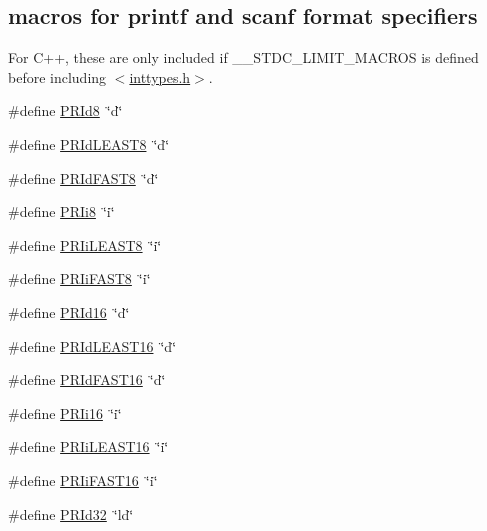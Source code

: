 \subsection*{macros for printf and scanf format specifiers}
\label{_amgrp308366f5f1be938cc93967ed6dbe20e9}%
For C++, these are only included if \+\_\+\+\_\+\+S\+T\+D\+C\+\_\+\+L\+I\+M\+I\+T\+\_\+\+M\+A\+C\+R\+OS is defined before including $<$\hyperlink{inttypes_8h}{inttypes.\+h}$>$. \begin{DoxyCompactItemize}
\item 
\#define \hyperlink{group__avr__inttypes_gae53c45f590033ad1f2f517faf3ab2f1b}{P\+R\+Id8}~\char`\"{}d\char`\"{}
\item 
\#define \hyperlink{group__avr__inttypes_ga404fd01f0b890cb8fac8641aaa704b57}{P\+R\+Id\+L\+E\+A\+S\+T8}~\char`\"{}d\char`\"{}
\item 
\#define \hyperlink{group__avr__inttypes_ga943961b7e7e564388dd743593db5bbbb}{P\+R\+Id\+F\+A\+S\+T8}~\char`\"{}d\char`\"{}
\item 
\#define \hyperlink{group__avr__inttypes_gadbe02b78cca747b2fe1a8f7fc5f5cd47}{P\+R\+Ii8}~\char`\"{}i\char`\"{}
\item 
\#define \hyperlink{group__avr__inttypes_ga526151b1725956030b501d9dd506f2e1}{P\+R\+Ii\+L\+E\+A\+S\+T8}~\char`\"{}i\char`\"{}
\item 
\#define \hyperlink{group__avr__inttypes_ga64fb4e44c3ff09179fc445979b7fdad1}{P\+R\+Ii\+F\+A\+S\+T8}~\char`\"{}i\char`\"{}
\item 
\#define \hyperlink{group__avr__inttypes_ga087e50fe0283aacc71d7138d13e91939}{P\+R\+Id16}~\char`\"{}d\char`\"{}
\item 
\#define \hyperlink{group__avr__inttypes_gae90ab00cb4417081dc68e9fd6c0e129a}{P\+R\+Id\+L\+E\+A\+S\+T16}~\char`\"{}d\char`\"{}
\item 
\#define \hyperlink{group__avr__inttypes_ga58cdfb02574b8c23d964a6e88a268782}{P\+R\+Id\+F\+A\+S\+T16}~\char`\"{}d\char`\"{}
\item 
\#define \hyperlink{group__avr__inttypes_ga655e9b358e0371a4bf5ff21cc08273e3}{P\+R\+Ii16}~\char`\"{}i\char`\"{}
\item 
\#define \hyperlink{group__avr__inttypes_ga96945864cb2d1f7de861ccaf639af02e}{P\+R\+Ii\+L\+E\+A\+S\+T16}~\char`\"{}i\char`\"{}
\item 
\#define \hyperlink{group__avr__inttypes_gac273fb2a05215962fbeae76abaaf0131}{P\+R\+Ii\+F\+A\+S\+T16}~\char`\"{}i\char`\"{}
\item 
\#define \hyperlink{group__avr__inttypes_ga6d94d1417e1b35c53aee6306590de72b}{P\+R\+Id32}~\char`\"{}ld\char`\"{}

\end{DoxyCompactItemize}
